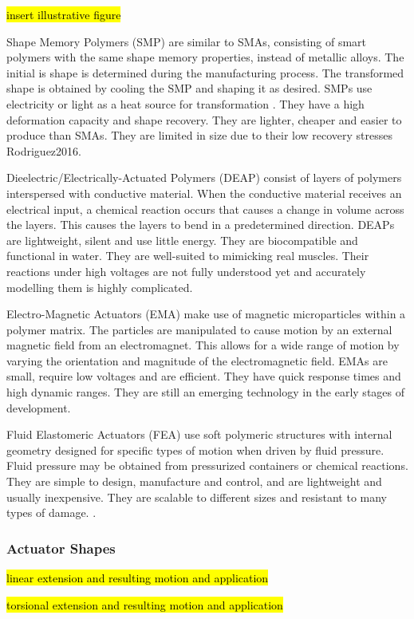 \hl{insert illustrative figure}

Shape Memory Polymers (SMP) are similar to SMAs, consisting of smart polymers with the same shape memory properties, instead of metallic alloys. The initial is shape is determined during the manufacturing process. The transformed shape is obtained by cooling the SMP and shaping it as desired. SMPs use electricity or light as a heat source for transformation \cite{Behl2207}. They have a high deformation capacity and shape recovery. They are lighter, cheaper and easier to produce than SMAs. They are limited in size due to their low recovery stresses {Rodriguez2016}.

Dieelectric/Electrically-Actuated Polymers (DEAP) consist of layers of polymers interspersed with conductive material. When the conductive material receives an electrical input, a chemical reaction occurs that causes a change in volume across the layers. This causes the layers to bend in a predetermined direction. DEAPs are lightweight, silent and use little energy. They are biocompatible and functional in water. They are well-suited to mimicking real muscles. Their reactions under high voltages are not fully understood yet and accurately modelling them is highly complicated. \cite{Mutlu2014}

Electro-Magnetic Actuators (EMA) make use of magnetic microparticles within a polymer matrix. The particles are manipulated to cause motion by an external magnetic field from an electromagnet. This allows for a wide range of motion by varying the orientation and magnitude of the electromagnetic field. EMAs are small, require low voltages and are efficient. They have quick response times and high dynamic ranges. They are still an emerging technology in the early stages of development. \cite{Do2018}

Fluid Elastomeric Actuators (FEA) use soft polymeric structures with internal geometry designed for specific types of motion when driven by fluid pressure. Fluid pressure may be obtained from pressurized containers or chemical reactions. They are simple to design, manufacture and control, and are lightweight and usually inexpensive. They are scalable to different sizes and resistant to many types of damage. \cite{Shepherd2011,Onal2017}.

\subsubsection{Actuator Shapes}

\hl{linear extension and resulting motion and application}

\hl{torsional extension and resulting motion and application}